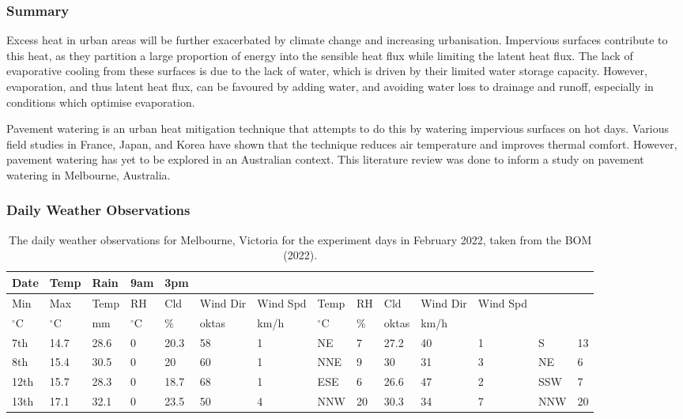 \documentclass[final,3p,times,authoryear]{elsarticle}
\begin{document}
\subsubsection{Summary}\label{sec:appendix7.1.5}
Excess heat in urban areas will be further exacerbated by climate change and increasing
urbanisation. Impervious surfaces contribute to this heat, as they partition a large
proportion of energy into the sensible heat flux while limiting the latent heat flux. The
lack of evaporative cooling from these surfaces is due to the lack of water, which is
driven by their limited water storage capacity. However, evaporation, and thus latent
heat flux, can be favoured by adding water, and avoiding water loss to drainage and
runoff, especially in conditions which optimise evaporation.

Pavement watering is an urban heat mitigation technique that attempts to do this by
watering impervious surfaces on hot days. Various field studies in France, Japan, and
Korea have shown that the technique reduces air temperature and improves thermal
comfort. However, pavement watering has yet to be explored in an Australian context.
This literature review was done to inform a study on pavement watering in Melbourne,
Australia.

\subsubsection{Daily Weather Observations}\label{sec:appendix7.2}

\begin{table}[!ht]\caption{The daily weather observations for Melbourne, Victoria for the experiment days in February
2022, taken from the BOM (2022).}
    \centering
    \begin{tabular}{|l|l|l|l|l|l|l|l|l|l|l|l|l|l|}
    \hline
        Date & Temp & Rain & 9am & 3pm & ~ & ~ & ~ & ~ & ~ & ~ & ~ & ~ & ~ \\ \hline
        Min & Max & Temp & RH & Cld & Wind Dir & Wind Spd & Temp & RH & Cld & Wind Dir & Wind Spd & ~ & ~ \\ \hline
       $^{\circ}$C &$^{\circ}$C & mm &$^{\circ}$C & \% & oktas & km/h &$^{\circ}$C & \% & oktas & km/h & ~ & ~ & ~ \\ \hline
        7th & 14.7 & 28.6 & 0 & 20.3 & 58 & 1 & NE & 7 & 27.2 & 40 & 1 & S & 13 \\ \hline
        8th & 15.4 & 30.5 & 0 & 20 & 60 & 1 & NNE & 9 & 30 & 31 & 3 & NE & 6 \\ \hline
        12th & 15.7 & 28.3 & 0 & 18.7 & 68 & 1 & ESE & 6 & 26.6 & 47 & 2 & SSW & 7 \\ \hline
        13th & 17.1 & 32.1 & 0 & 23.5 & 50 & 4 & NNW & 20 & 30.3 & 34 & 7 & NNW & 20 \\ \hline
    \end{tabular}\label{table:7.3}
\end{table}
\end{document}
